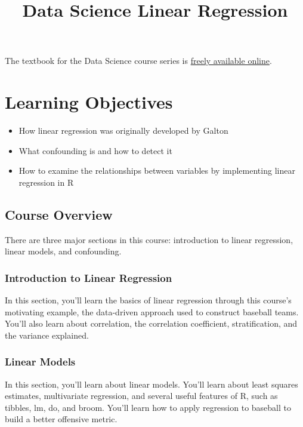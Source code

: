 \documentclass[
]{article}
\title{Data Science Linear Regression}
\author{}
\date{\vspace{-2.5em}}
\providecommand{\tightlist}{%
  \setlength{\itemsep}{0pt}\setlength{\parskip}{0pt}}
\begin{document}
\maketitle

The textbook for the Data Science course series is
\href{https://rafalab.github.io/dsbook/}{freely available online}.

\hypertarget{learning-objectives}{%
\section{Learning Objectives}\label{learning-objectives}}

\begin{itemize}
\tightlist
\item
  How linear regression was originally developed by Galton
\item
  What confounding is and how to detect it
\item
  How to examine the relationships between variables by implementing
  linear regression in R
\end{itemize}

\hypertarget{course-overview}{%
\subsection{Course Overview}\label{course-overview}}

There are three major sections in this course: introduction to linear
regression, linear models, and confounding.

\hypertarget{introduction-to-linear-regression}{%
\subsubsection{Introduction to Linear
Regression}\label{introduction-to-linear-regression}}

In this section, you'll learn the basics of linear regression through
this course's motivating example, the data-driven approach used to
construct baseball teams. You'll also learn about correlation, the
correlation coefficient, stratification, and the variance explained.

\hypertarget{linear-models}{%
\subsubsection{Linear Models}\label{linear-models}}

In this section, you'll learn about linear models. You'll learn about
least squares estimates, multivariate regression, and several useful
features of R, such as tibbles, lm, do, and broom. You'll learn how to
apply regression to baseball to build a better offensive metric.
\end{document}
